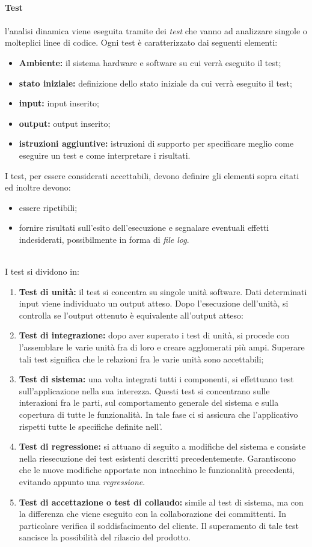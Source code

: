 \mbox{}\\
\textbf{Test} \mbox{}\\ \mbox{}\\
l'analisi dinamica viene eseguita tramite dei \textit{test} che vanno ad analizzare singole o molteplici linee di codice. Ogni test è caratterizzato dai seguenti elementi:
\begin{itemize}
	\item \textbf{Ambiente: } il sistema hardware e software su cui verrà eseguito il test;
	\item \textbf{stato iniziale:} definizione dello stato iniziale da cui verrà eseguito il test;
	\item \textbf{input: } input inserito;
	\item \textbf{output: } output inserito;
	\item \textbf{istruzioni aggiuntive: } istruzioni di supporto per specificare meglio come eseguire un test e come interpretare i risultati.
\end{itemize}
I test, per essere considerati accettabili, devono definire gli elementi sopra citati ed inoltre devono:
\begin{itemize}
	\item essere ripetibili;
	\item fornire risultati sull'esito dell'esecuzione e segnalare eventuali effetti indesiderati, possibilmente in forma di \textit{file log}. 
\end{itemize}
\mbox{}\\
I test si dividono in:
\begin{enumerate}
	\item \textbf{Test di unità:} il test si concentra su singole unità software. Dati determinati input viene individuato un output atteso. Dopo l'esecuzione dell'unità, si controlla se l'output ottenuto è equivalente all'output atteso:
	\item \textbf{Test di integrazione:} dopo aver superato i test di unità, si procede con l'assemblare le varie unità fra di loro e creare agglomerati più ampi. Superare tali test significa che le relazioni fra le varie unità sono accettabili;
	\item \textbf{Test di sistema:} una volta integrati tutti i componenti, si effettuano test sull'applicazione nella sua interezza. Questi test si concentrano sulle interazioni fra le parti, sul comportamento generale del sistema e sulla copertura di tutte le funzionalità. In tale fase ci si assicura che l'applicativo rispetti tutte le specifiche definite nell'\AdRv.
	\item \textbf{Test di regressione:} si attuano di seguito a modifiche del sistema e consiste nella riesecuzione dei test esistenti descritti precedentemente. Garantiscono che le nuove modifiche apportate non intacchino le funzionalità precedenti, evitando appunto una \textit{regressione}.
	\item \textbf{Test di accettazione o test di collaudo:} simile al test di sistema, ma con la differenza che viene eseguito con la collaborazione dei committenti. In particolare verifica il soddisfacimento del cliente. Il superamento di tale test sancisce la possibilità del rilascio del prodotto. 
\end{enumerate}
